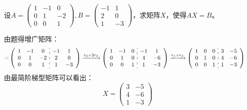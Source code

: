 \documentclass[a4paper]{report}
\begin{document}
\EX 设$
A=
\begin{pmatrix}
1&-1&0\\
0&1&-2\\
0&0&1
\end{pmatrix},B=
\begin{pmatrix}
-1&1\\
2&0\\
1&-3
\end{pmatrix}
$，求矩阵$X$，使得$AX=B$。

\begin{jie}
由题得增广矩阵：
\begin{align*}
[A|B]=&
\left(
 \begin{array}{c:c}
\begin{matrix}
1&-1&0\\
0&1&-2\\
0&0&1
\end{matrix}&
\begin{matrix}
-1&1\\
2&0\\
1&-3
\end{matrix}
\end{array}
\right)\xrightarrow{\substack{r_{2}+2 r_{3}}}
{
\left(
 \begin{array}{c:c}
\begin{matrix}
1&-1&0\\
0&1&0\\
0&0&1
\end{matrix}&
\begin{matrix}
-1&1\\
4&-6\\
1&-3
\end{matrix}
\end{array}
\right)
}\xrightarrow{\substack{r_{1}+ r_{2}}}
{
\left(
 \begin{array}{c:c}
\begin{matrix}
1&0&0\\
0&1&0\\
0&0&1
\end{matrix}&
\begin{matrix}
3&-5\\
4&-6\\
1&-3
\end{matrix}
\end{array}
\right)
}
\end{align*}
由最简阶梯型矩阵可以看出：
\begin{equation*}
X=\begin{pmatrix}
3&-5\\
4&-6\\
1&-3
\end{pmatrix}
\end{equation*}
\end{jie}
\end{document}
